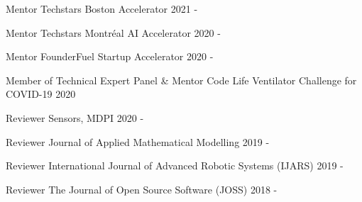 \begin{cvhonors}

\cvhonor
{Mentor}
{Techstars Boston Accelerator}
{}
{2021 - }

\cvhonor
{Mentor}
{Techstars Montréal AI Accelerator}
{}
{2020 - }

\cvhonor
{Mentor}
{FounderFuel Startup Accelerator}
{}
{2020 - }

\cvhonor
{Member of Technical Expert Panel \& Mentor}
{Code Life Ventilator Challenge for COVID-19}
{}
{2020}

\cvhonor
{Reviewer}
{Sensors, MDPI}
{}
{2020 - }

\cvhonor
{Reviewer}
{Journal of Applied Mathematical Modelling}
{}
{2019 - }

\cvhonor
{Reviewer}
{International Journal of Advanced Robotic Systems (IJARS)}
{}
{2019 - }

\cvhonor
{Reviewer}
{The Journal of Open Source Software (JOSS)}
{}
{2018 - }

\end{cvhonors}
